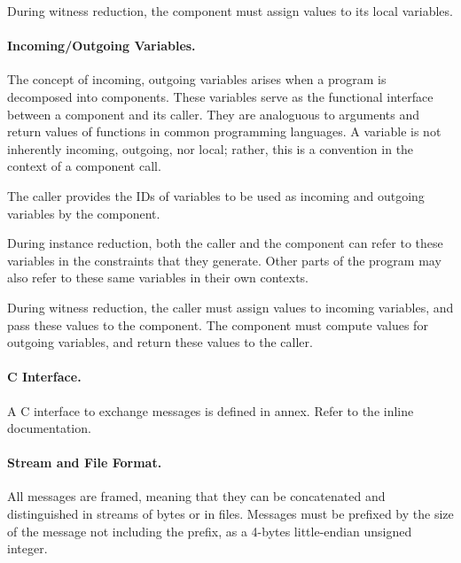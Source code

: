 	During witness reduction, the component must assign values to its local variables.

\paragraph{Incoming/Outgoing Variables.}

	The concept of incoming, outgoing variables arises when a program is decomposed into components.
	These variables serve as the functional interface between a component and its caller.
	They are analoguous to arguments and return values of functions in common programming languages.
	A variable is not inherently incoming, outgoing, nor local;
	rather, this is a convention in the context of a component call.

	The caller provides the IDs of variables to be used as incoming and outgoing variables by the component.

	During instance reduction, both the caller and the component can refer to
	these variables in the constraints that they generate.
	Other parts of the program may also refer to these same variables in their own contexts.

	During witness reduction, the caller must assign values to incoming variables,
	and pass these values to the component.
	The component must compute values for outgoing variables, and return these values to the caller.

\paragraph{C Interface.}

	A C interface to exchange messages is defined in annex.
	Refer to the inline documentation.

\paragraph{Stream and File Format.}
	All messages are framed, meaning that they can be concatenated and distinguished in streams of bytes or in files.
	Messages must be prefixed by the size of the message not including the prefix,
	as a 4-bytes little-endian unsigned integer.

